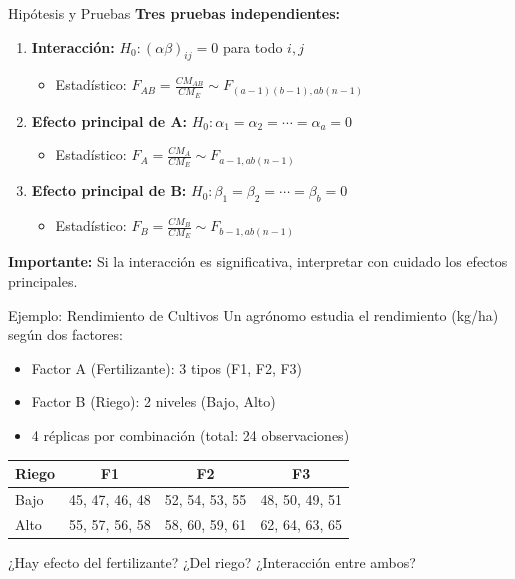 \documentclass[aspectratio=169]{beamer}
\begin{document}
\begin{frame}{Hipótesis y Pruebas}
\textbf{Tres pruebas independientes:}

\begin{enumerate}
\item \textbf{Interacción:} $H_0: (\alpha\beta)_{ij} = 0$ para todo $i,j$
\begin{itemize}
\item Estadístico: $F_{AB} = \frac{CM_{AB}}{CM_E} \sim F_{(a-1)(b-1), ab(n-1)}$
\end{itemize}

\vspace{0.2cm}

\item \textbf{Efecto principal de A:} $H_0: \alpha_1 = \alpha_2 = \cdots = \alpha_a = 0$
\begin{itemize}
\item Estadístico: $F_A = \frac{CM_A}{CM_E} \sim F_{a-1, ab(n-1)}$
\end{itemize}

\vspace{0.2cm}

\item \textbf{Efecto principal de B:} $H_0: \beta_1 = \beta_2 = \cdots = \beta_b = 0$
\begin{itemize}
\item Estadístico: $F_B = \frac{CM_B}{CM_E} \sim F_{b-1, ab(n-1)}$
\end{itemize}
\end{enumerate}

\vspace{0.2cm}
\textbf{Importante:} Si la interacción es significativa, interpretar con cuidado los efectos principales.
\end{frame}

\begin{frame}{Ejemplo: Rendimiento de Cultivos}
\small
Un agrónomo estudia el rendimiento (kg/ha) según dos factores:
\begin{itemize}
\item Factor A (Fertilizante): 3 tipos (F1, F2, F3)
\item Factor B (Riego): 2 niveles (Bajo, Alto)
\item 4 réplicas por combinación (total: 24 observaciones)
\end{itemize}

\begin{table}
\centering
\begin{tabular}{lccc}
\toprule
\textbf{Riego} & \textbf{F1} & \textbf{F2} & \textbf{F3} \\
\midrule
Bajo & 45, 47, 46, 48 & 52, 54, 53, 55 & 48, 50, 49, 51 \\
Alto & 55, 57, 56, 58 & 58, 60, 59, 61 & 62, 64, 63, 65 \\
\bottomrule
\end{tabular}
\end{table}

¿Hay efecto del fertilizante? ¿Del riego? ¿Interacción entre ambos?
\end{frame}
\end{document}
